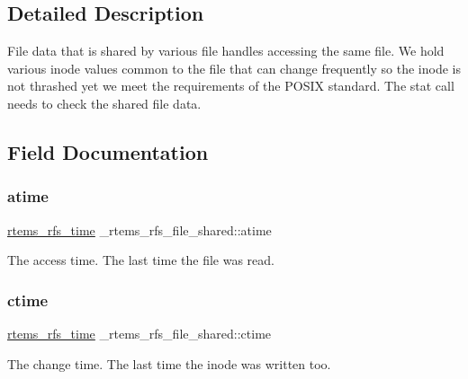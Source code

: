 \subsection{Detailed Description}
File data that is shared by various file handles accessing the same file. We hold various inode values common to the file that can change frequently so the inode is not thrashed yet we meet the requirements of the P\+O\+S\+IX standard. The stat call needs to check the shared file data. 

\subsection{Field Documentation}
\mbox{\label{struct__rtems__rfs__file__shared_a9f36f49e4410534f4b9d71c24ba5e7a5}} 
\subsubsection{\texorpdfstring{atime}{atime}}
{\footnotesize\ttfamily \mbox{\hyperlink{rtems-rfs-inode_8h_a7877cc60240d76cccb89acaffdd20aa6}{rtems\+\_\+rfs\+\_\+time}} \+\_\+rtems\+\_\+rfs\+\_\+file\+\_\+shared\+::atime}

The access time. The last time the file was read. \mbox{\label{struct__rtems__rfs__file__shared_aa97064ef5014a727cbbb43ac018dd774}} 
\subsubsection{\texorpdfstring{ctime}{ctime}}
{\footnotesize\ttfamily \mbox{\hyperlink{rtems-rfs-inode_8h_a7877cc60240d76cccb89acaffdd20aa6}{rtems\+\_\+rfs\+\_\+time}} \+\_\+rtems\+\_\+rfs\+\_\+file\+\_\+shared\+::ctime}

The change time. The last time the inode was written too. \mbox{\label{struct__rtems__rfs__file__shared_a7b2dd0a580796f25377f1417deb9bf6d}} 
